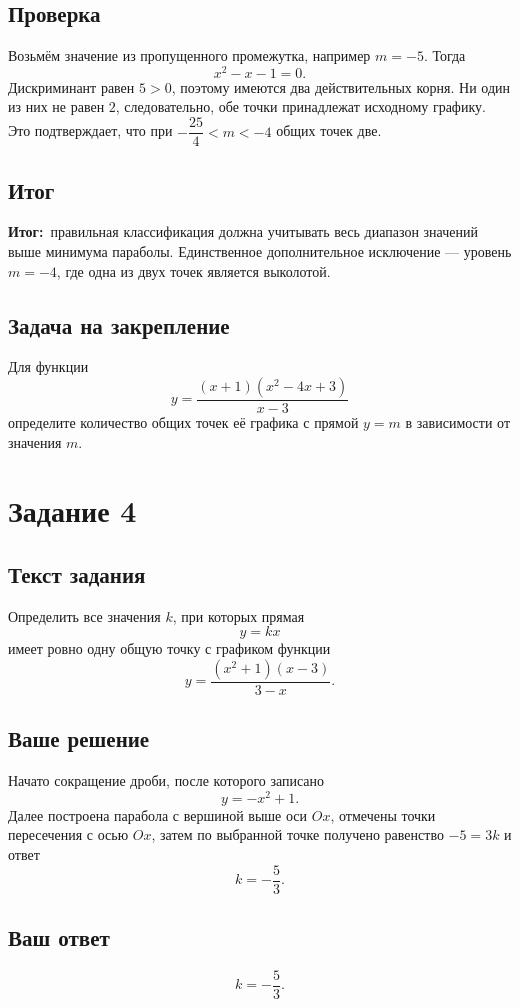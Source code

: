 \documentclass[12pt,a4paper]{article}
\newcommand{\resultlabel}{\textcolor{teal!60!black}{\textbf{Итог:}}}
\begin{document}
\subsection*{Проверка}
Возьмём значение из пропущенного промежутка, например $m=-5$. Тогда
\[
x^2-x-1=0.
\]
Дискриминант равен $5>0$, поэтому имеются два действительных корня. Ни один из них не равен $2$, следовательно, обе точки принадлежат исходному графику. Это подтверждает, что при $-\dfrac{25}{4}<m<-4$ общих точек две.

\subsection*{Итог}
\resultlabel\ правильная классификация должна учитывать весь диапазон значений выше минимума параболы. Единственное дополнительное исключение --- уровень $m=-4$, где одна из двух точек является выколотой.

\subsection*{Задача на закрепление}
Для функции
\[
y=\frac{(x+1)(x^2-4x+3)}{x-3}
\]
определите количество общих точек её графика с прямой $y=m$ в зависимости от значения $m$.

\newpage
{}\label{task:4}
\section*{Задание 4}

\subsection*{Текст задания}
Определить все значения $k$, при которых прямая
\[
y=kx
\]
имеет ровно одну общую точку с графиком функции
\[
y=\frac{(x^2+1)(x-3)}{3-x}.
\]

\subsection*{Ваше решение}
Начато сокращение дроби, после которого записано
\[
y=-x^2+1.
\]
Далее построена парабола с вершиной выше оси $Ox$, отмечены точки пересечения с осью $Ox$, затем по выбранной точке получено равенство $-5=3k$ и ответ
\[
k=-\frac{5}{3}.
\]

\subsection*{Ваш ответ}
\[
k=-\frac{5}{3}.
\]
\end{document}
